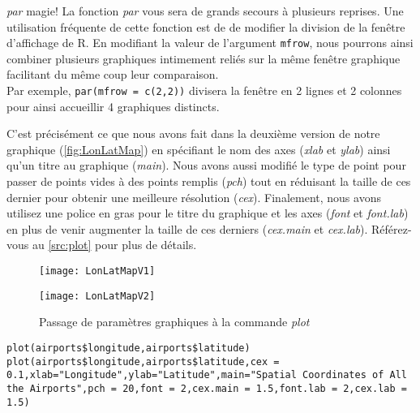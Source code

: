 \begin{moreInfo}{\emph{par} magie!}
	La fonction \emph{par} vous sera de grands secours à plusieurs reprises. Une utilisation fréquente de cette fonction est de de modifier la division de la fenêtre d'affichage de R. En modifiant la valeur de l'argument \texttt{mfrow}, nous pourrons ainsi combiner plusieurs graphiques intimement reliés sur la même fenêtre graphique facilitant du même coup leur comparaison. \\
	Par exemple, \texttt{par(mfrow = c(2,2))} divisera la fenêtre en 2 lignes et 2 colonnes pour ainsi accueillir 4 graphiques distincts.
\end{moreInfo}

\noindent
C'est précisément ce que nous avons fait dans la deuxième version de notre graphique (\autoref{fig:LonLatMap}) en spécifiant le nom des axes (\emph{xlab} et \emph{ylab}) ainsi qu'un titre au graphique (\emph{main}). Nous avons aussi modifié le type de point pour passer de points vides à des points remplis (\emph{pch}) tout en réduisant la taille de ces dernier pour obtenir une meilleure résolution (\emph{cex}). Finalement, nous avons utilisez une police en gras pour le titre du graphique et les axes (\emph{font} et \emph{font.lab}) en plus de venir augmenter la taille de ces derniers (\emph{cex.main} et \emph{cex.lab}). Référez-vous au \autoref{src:plot} pour plus de détails. \\
	
\begin{figure}
	\begin{minipage}{\textwidth}
		\centering
		\texttt{[image: LonLatMapV1]}
	\end{minipage}
	\newline
	\begin{minipage}{\textwidth}
		\centering
		\texttt{[image: LonLatMapV2]}
	\end{minipage}
	\caption{Passage de paramètres graphiques à la commande \emph{plot}}
\end{figure}
\label{fig:LonLatMap}

\begin{lstlisting}[caption = Utilisation de la commande \emph{plot},label=src:plot]
plot(airports$longitude,airports$latitude)
plot(airports$longitude,airports$latitude,cex = 0.1,xlab="Longitude",ylab="Latitude",main="Spatial Coordinates of All the Airports",pch = 20,font = 2,cex.main = 1.5,font.lab = 2,cex.lab = 1.5)
\end{lstlisting}

